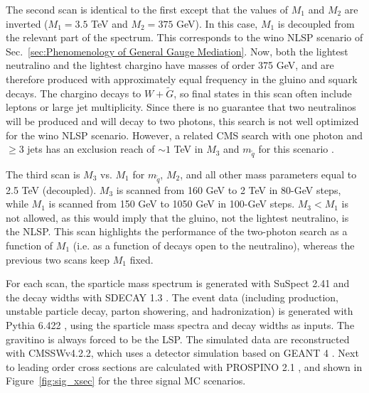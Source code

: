 \documentclass[dissertation.tex]{subfiles}
\begin{document}
The second scan is identical to the first except that the values of $M_{1}$ and $M_{2}$ are inverted ($M_{1} = 3.5$ TeV and $M_{2} = 375$ GeV).  In this case, $M_{1}$ is decoupled from the relevant part of the spectrum.  This corresponds to the wino NLSP scenario of Sec.~\ref{sec:Phenomenology of General Gauge Mediation}.  Now, both the lightest neutralino and the lightest chargino have masses of order 375 GeV, and are therefore produced with approximately equal frequency in the gluino and squark decays.  The chargino decays to $W+\tilde{G}$, so final states in this scan often include leptons or large jet multiplicity.  Since there is no guarantee that two neutralinos will be produced and will decay to two photons, this search is not well optimized for the wino NLSP scenario.  However, a related CMS search with one photon and $\geq3$ jets has an exclusion reach of $\sim1$ TeV in $M_{3}$ and $m_{\tilde{q}}$ for this scenario \cite{CMS-PAS-SUS-12-001}.

The third scan is $M_{3}$ vs. $M_{1}$ for $m_{\tilde{q}}$, $M_{2}$, and all other mass parameters equal to 2.5 TeV (decoupled).  $M_{3}$ is scanned from 160 GeV to 2 TeV in 80-GeV steps, while $M_{1}$ is scanned from 150 GeV to 1050 GeV in 100-GeV steps.  $M_{3} < M_{1}$ is not allowed, as this would imply that the gluino, not the lightest neutralino, is the NLSP.  This scan highlights the performance of the two-photon search as a function of $M_{1}$ (i.e. as a function of decays open to the neutralino), whereas the previous two scans keep $M_{1}$ fixed.

For each scan, the sparticle mass spectrum is generated with SuSpect 2.41 \cite{SuSpect} and the decay widths with SDECAY 1.3 \cite{Muhlleitner200546}.  The event data (including production, unstable particle decay, parton showering, and hadronization) is generated with Pythia 6.422 \cite{1126-6708-2006-05-026}, using the sparticle mass spectra and decay widths as inputs.  The gravitino is always forced to be the LSP.  The simulated data are reconstructed with CMSSWv4.2.2, which uses a detector simulation based on GEANT 4 \cite{1610988}.  Next to leading order cross sections are calculated with PROSPINO 2.1 \cite{PROSPINO}, and shown in Figure~\ref{fig:sig_xsec} for the three signal MC scenarios.
\end{document}
